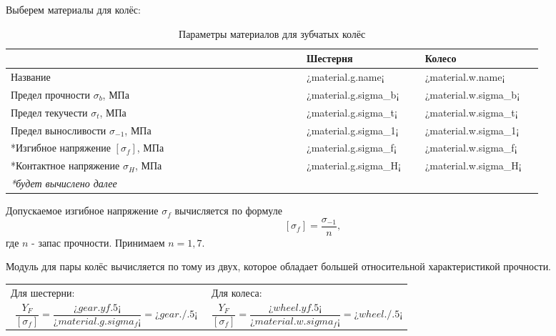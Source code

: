 \documentclass[14pt,a4paper,russian]{scrartcl}
\begin{document}
        Выберем материалы для колёс:
        \begin{table}[h!]
            \begin{center}
                \begin{tabular}{p{0.5\linewidth}p{0.2\linewidth}p{0.2\linewidth}}
                    \hline
                        & Шестерня  &   Колесо\\
                    \hline
                    Название    & ¿material.g.name¡ &   ¿material.w.name¡ \\
                    Предел прочности \( \sigma_b \), МПа  & ¿material.g.sigma_b¡ & ¿material.w.sigma_b¡ \\
                    Предел текучести \( \sigma_t \), МПа  &   ¿material.g.sigma_t¡ & ¿material.w.sigma_t¡ \\
                    Предел выносливости \( \sigma_{-1} \), МПа  & ¿material.g.sigma_1¡ & ¿material.w.sigma_1¡ \\
                    *Изгибное напряжение \( [\sigma_f] \), МПа & ¿material.g.sigma_f¡ & ¿material.w.sigma_f¡ \\
                    *Контактное напряжение \( \sigma_H \), МПа & ¿material.g.sigma_H¡ & ¿material.w.sigma_H¡ \\
                    \hline
                    \emph{*будет вычислено далее}
                \end{tabular}
                \caption{Параметры материалов для зубчатых колёс}\label{tab:gear_materials}
            \end{center}
        \end{table}

        Допускаемое изгибное напряжение \( \sigma_f \) вычисляется по формуле 
        \[ [\sigma_f] = \frac{\sigma_{-1}}{n}, \]
        где \( n \) - запас прочности. Принимаем \( n=1,7 \).\par
        
        Модуль для пары колёс вычисляется по тому из двух, которое обладает
        большей относительной характеристикой прочности.

       \begin{table}[h!]
            \begin{center}
                \begin{tabular}{p{0.5\linewidth}p{0.5\linewidth}}
                    Для шестерни:  &   Для колеса:\\
                    \[ \frac{Y_F}{[\sigma_f]} = 
                        \frac{¿gear.yf.5¡}{¿material.g.sigma_f¡} = ¿gear./.5¡\] &
                    \[ \frac{Y_F}{[\sigma_f]} = 
                    \frac{¿wheel.yf.5¡}{¿material.w.sigma_f¡} = ¿wheel./.5¡ \]\\                    
                \end{tabular}
            \end{center}
        \end{table}
\end{document}
